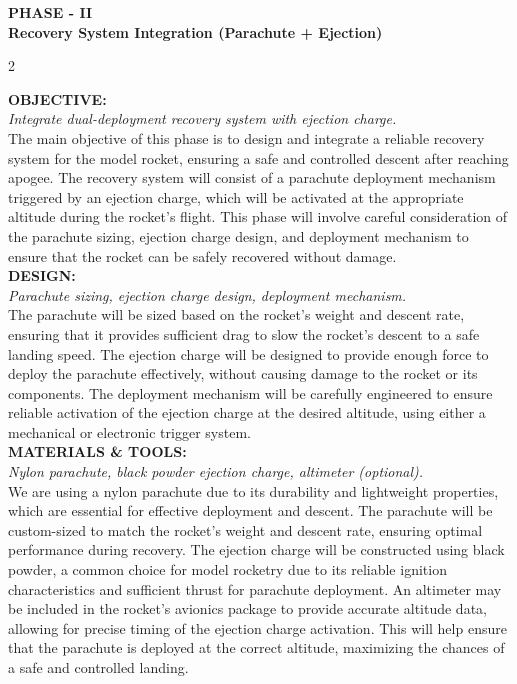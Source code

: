 \documentclass[10pt]{report}
\begin{document}
  \newpage
  \begin{center}
    \textbf{\LARGE PHASE - II} \\
    \vspace{0.2cm}
    \textbf{\Large Recovery System Integration (Parachute + Ejection)}
  \end{center}

  \begin{multicols}{2}
      

  \noindent \textbf{\large OBJECTIVE:} \\ \textit{Integrate dual-deployment recovery system with ejection charge.} \\
  The main objective of this phase is to design and integrate a reliable recovery system for the model rocket, ensuring a safe and controlled descent after reaching apogee. The recovery system will consist of a parachute deployment mechanism triggered by an ejection charge, which will be activated at the appropriate altitude during the rocket's flight. This phase will involve careful consideration of the parachute sizing, ejection charge design, and deployment mechanism to ensure that the rocket can be safely recovered without damage. \\

  \noindent \textbf{DESIGN:}\\  \textit{Parachute sizing, ejection charge design, deployment mechanism.}\\ 
  The parachute will be sized based on the rocket's weight and descent rate, ensuring that it provides sufficient drag to slow the rocket's descent to a safe landing speed. The ejection charge will be designed to provide enough force to deploy the parachute effectively, without causing damage to the rocket or its components. The deployment mechanism will be carefully engineered to ensure reliable activation of the ejection charge at the desired altitude, using either a mechanical or electronic trigger system. \\

  \noindent \textbf{\large MATERIALS \& TOOLS:}\\  \textit{Nylon parachute, black powder ejection charge, altimeter (optional).}\\
  We are using a nylon parachute due to its durability and lightweight properties, which are essential for effective deployment and descent. The parachute will be custom-sized to match the rocket's weight and descent rate, ensuring optimal performance during recovery. The ejection charge will be constructed using black powder, a common choice for model rocketry due to its reliable ignition characteristics and sufficient thrust for parachute deployment. An altimeter may be included in the rocket's avionics package to provide accurate altitude data, allowing for precise timing of the ejection charge activation. This will help ensure that the parachute is deployed at the correct altitude, maximizing the chances of a safe and controlled landing. \\


\end{multicols}
\end{document}
